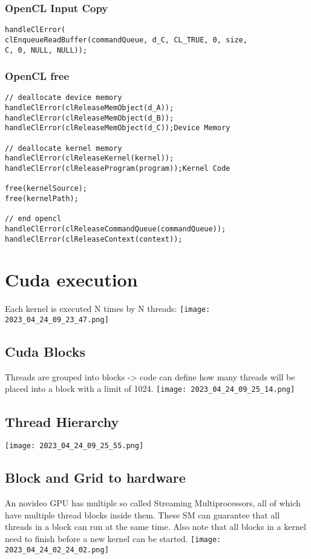 \documentclass[main.tex,fontsize=8pt,paper=a4,paper=portrait,DIV=calc,]{scrartcl}
\begin{document}
\subsubsection{OpenCL Input Copy}
\begin{lstlisting}
handleClError(
clEnqueueReadBuffer(commandQueue, d_C, CL_TRUE, 0, size,
C, 0, NULL, NULL));
\end{lstlisting}

\subsubsection{OpenCL free}
\begin{lstlisting}
// deallocate device memory 
handleClError(clReleaseMemObject(d_A));
handleClError(clReleaseMemObject(d_B));
handleClError(clReleaseMemObject(d_C));Device Memory

// deallocate kernel memory
handleClError(clReleaseKernel(kernel));
handleClError(clReleaseProgram(program));Kernel Code

free(kernelSource);
free(kernelPath);

// end opencl
handleClError(clReleaseCommandQueue(commandQueue));
handleClError(clReleaseContext(context));
\end{lstlisting}

\section{Cuda execution}
Each kernel is executed N times by N threads:\newline
\texttt{[image: 2023\_04\_24\_09\_23\_47.png]}\newline

\subsection{Cuda Blocks}
Threads are grouped into blocks -> code can define how many threads will be placed into a block with a limit of 1024.\newline
\texttt{[image: 2023\_04\_24\_09\_25\_14.png]}

\subsection{Thread Hierarchy}
\texttt{[image: 2023\_04\_24\_09\_25\_55.png]}

\subsection{Block and Grid to hardware}
An novideo GPU has multiple so called Streaming Multiprocessors, all of which have multiple thread blocks inside them.\newline
These SM can guarantee that all threads in a block can run at the same time.\newline
Also note that all blocks in a kernel need to finish before a new kernel can be started.\newline
\texttt{[image: 2023\_04\_24\_02\_24\_02.png]}
\end{document}
